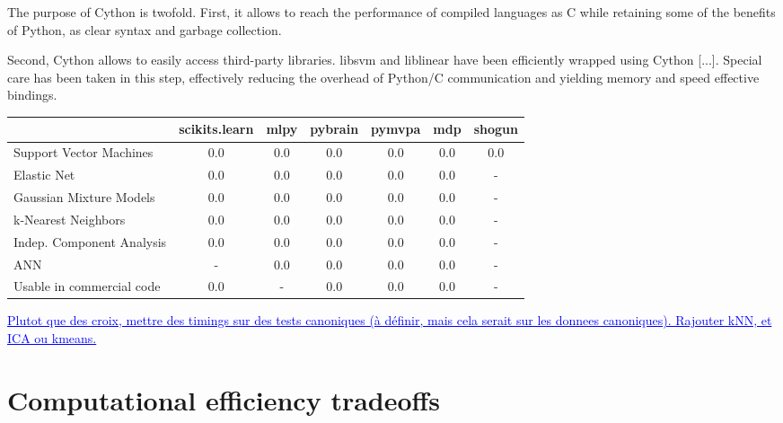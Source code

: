 \documentclass[twoside,11pt]{article}
\newcommand{\GAEL}[1]{\textcolor{blue}{\uline{#1}}}
\begin{document}


The purpose of Cython is twofold. First, it allows to reach the
performance of compiled languages as C while retaining some of the
benefits of Python, as clear syntax and garbage collection.

Second, Cython allows to easily access third-party libraries. libsvm
and liblinear have been efficiently wrapped using Cython [...]. Special
care has been taken in this step, effectively reducing the overhead of
Python/C communication and yielding memory and speed effective bindings.




\begin{center}


\begin{tabular}{l c c c c c c}
\hline\hline %
 & scikits.learn & mlpy & pybrain & pymvpa &  mdp & shogun \\ [0.5ex]
\hline
Support Vector Machines        & 0.0 & 0.0   & 0.0       &  0.0     & 0.0    & 0.0 \\
Elastic Net & 0.0 & 0.0   & 0.0       &  0.0     & 0.0    & - \\
Gaussian Mixture Models  & 0.0 & 0.0   & 0.0       &  0.0     & 0.0    & - \\
k-Nearest Neighbors & 0.0 & 0.0   & 0.0       &  0.0     & 0.0    & - \\
Indep. Component Analysis & 0.0 & 0.0  & 0.0  & 0.0  & 0.0  & - \\
ANN  & - & 0.0  & 0.0  & 0.0  & 0.0  & - \\
Usable in commercial code &  0.0 & -   & 0.0       &  0.0     & 0.0    & - \\
\hline
\end{tabular}
\GAEL{Plutot que des croix, mettre des timings sur des tests canoniques (à 
définir, mais cela serait sur les donnees canoniques). Rajouter kNN, et
ICA ou kmeans.}\\

\end{center}


\section{Computational efficiency tradeoffs}
\end{document}
